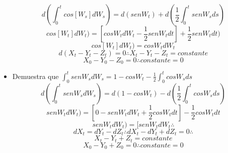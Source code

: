 \documentclass[11pt,fleqn]{book} %
\numberwithin{equation}{section} %
\numberwithin{figure}{section} %
\numberwithin{table}{section} %
\begin{document}
\begin{itemize}
    $$d(\int_{0}^{t} cos[W_{s}] dW_{s}) = d(senW_{t}) + d(\frac{1}{2} \int_{0}^{t} senW_{s} ds)$$
    $$ cos[W_{t}] dW_{t}) = [cosW_{t}dW_{t} - \frac{1}{2} senW_{t} dt] + \frac{1}{2} senW_{t} dt)$$
    $$ cos[W_{t}] dW_{t}) = cosW_{t}dW_{t} $$
    $$d(X_{t}-Y_{t}-Z_{t})=0 \therefore X_{t}-Y_{t}-Z_{t} = constante $$
    $$X_{0}-Y_{0}-Z_{0}=0 \therefore constante = 0 $$
    \item Demuestra que $\int_{0}^{t} sen W_{s} dW_{s} = 1-cosW_{t} - \frac{1}{2} \int_{0}^{t} cosW_{s} ds$
    $$ d(\int_{0}^{t} sen W_{s} dW_{s}) = d(1-cosW_{t}) - d(\frac{1}{2} \int_{0}^{t} cosW_{s} ds ) $$
    $$ sen W_{t} dW_{t}) = [0-senW_{t} dW_{t} + \frac{1}{2}cosW_{t} dt] - \frac{1}{2}cosW_{t} dt  $$
    $$ sen W_{t} dW_{t}) = [senW_{t} dW_{t} \therefore$$
    $$ dX_{t} = dY_{t} - dZ_{t} \therefore dX_{t} - dY_{t} + dZ_{t} = 0 \therefore  $$
    $$ X_{t} - Y_{t} + Z_{t} = constante $$
    $$ X_{0} - Y_{0} + Z_{0}= 0 \therefore constante = 0 $$
\end{itemize}
\end{document}
